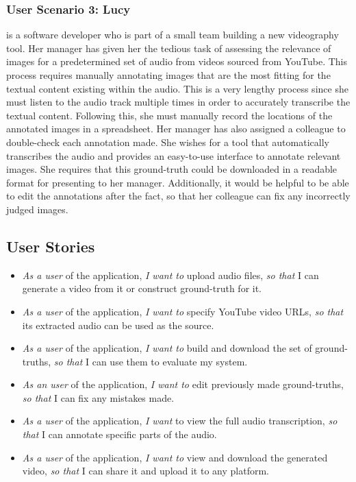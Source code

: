 \documentclass{l4proj}
\begin{document}
\subsubsection{User Scenario 3: Lucy} is a software developer who is part of a small team building a new videography tool. Her manager has given her the tedious task of assessing the relevance of images for a predetermined set of audio from videos sourced from YouTube. This process requires manually annotating images that are the most fitting for the textual content existing within the audio. This is a very lengthy process since she must listen to the audio track multiple times in order to accurately transcribe the textual content. Following this, she must manually record the locations of the annotated images in a spreadsheet. Her manager has also assigned a colleague to double-check each annotation made. She wishes for a tool that automatically transcribes the audio and provides an easy-to-use interface to annotate relevant images. She requires that this ground-truth could be downloaded in a readable format for presenting to her manager. Additionally, it would be helpful to be able to edit the annotations after the fact, so that her colleague can fix any incorrectly judged images.


\subsection{User Stories}
\begin{itemize}
    \item \emph{As a user} of the application, \emph{I want to} upload audio files, \emph{so that} I can generate a video from it or construct ground-truth for it.
    \item \emph{As a user} of the application, \emph{I want to} specify YouTube video URLs, \emph{so that} its extracted audio can be used as the source.
    \item \emph{As a user} of the application, \emph{I want to} build and download the set of ground-truths, \emph{so that} I can use them to evaluate my system.
    \item \emph{As an user} of the application, \emph{I want to} edit previously made ground-truths, \emph{so that} I can fix any mistakes made.
    \item \emph{As a user} of the application, \emph{I want} to view the full audio transcription, \emph{so that} I can annotate specific parts of the audio.
    \item \emph{As a user} of the application, \emph{I want to} view and download the generated video, \emph{so that} I can share it and upload it to any platform.
\end{itemize}
\end{document}
